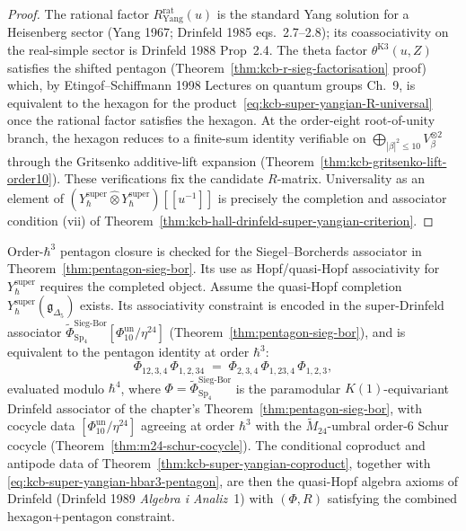 \begin{proof}
The rational factor $R^{\mathrm{rat}}_{\mathrm{Yang}}(u)$ is the
standard Yang solution for a Heisenberg sector (Yang 1967; Drinfeld
1985 eqs.~2.7--2.8); its coassociativity on the real-simple sector is
Drinfeld 1988 Prop~2.4. The theta factor $\theta^{\mathrm{K3}}(u,Z)$
satisfies the shifted pentagon
(Theorem~\ref{thm:kcb-r-sieg-factorisation} proof)
which, by Etingof--Schiffmann 1998
\textup{Lectures on quantum groups} Ch.~9, is equivalent to the
hexagon for the product~\eqref{eq:kcb-super-yangian-R-universal} once
the rational factor satisfies the hexagon. At the order-eight
root-of-unity branch, the hexagon
reduces to a finite-sum identity verifiable on
$\bigoplus_{|\beta|^2\leq 10}V_\beta^{\otimes 2}$ through the
Gritsenko additive-lift expansion
(Theorem~\ref{thm:kcb-gritsenko-lift-order10}). These verifications fix
the candidate \(R\)-matrix. Universality as an element of
\((Y_\hbar^{\mathrm{super}}\widehat\otimes
Y_\hbar^{\mathrm{super}})[[u^{-1}]]\) is precisely the completion and
associator condition \textup{(vii)} of
Theorem~\ref{thm:kcb-hall-drinfeld-super-yangian-criterion}.
\end{proof}

\begin{theorem}
\label{thm:kcb-super-yangian-hbar3-pentagon}
Order-\(\hbar^3\) pentagon closure is checked for the
Siegel--Borcherds associator in
Theorem~\ref{thm:pentagon-sieg-bor}. Its use as Hopf/quasi-Hopf
associativity for \(Y_\hbar^{\mathrm{super}}\) requires the completed
object. Assume the quasi-Hopf completion
$Y_\hbar^{\mathrm{super}}(\mathfrak{g}_{\Delta_5})$ exists. Its
associativity constraint is encoded in the
super-Drinfeld associator
$\widetilde\Phi^{\mathrm{Sieg\text{-}Bor}}_{\mathrm{Sp}_4}[\Phi_{10}^{\mathrm{un}}/\eta^{24}]$
(Theorem~\ref{thm:pentagon-sieg-bor}), and is equivalent to the
pentagon identity at order $\hbar^3$:
\begin{equation}
\label{eq:kcb-super-yangian-hbar3-pentagon}
 \Phi_{12,3,4}\,\Phi_{1,2,34}
 \;=\;
 \Phi_{2,3,4}\,\Phi_{1,23,4}\,\Phi_{1,2,3},
\end{equation}
evaluated modulo $\hbar^4$, where
$\Phi=\widetilde\Phi^{\mathrm{Sieg\text{-}Bor}}_{\mathrm{Sp}_4}$ is the
paramodular $K(1)$-equivariant Drinfeld associator of the chapter's
Theorem~\ref{thm:pentagon-sieg-bor}, with cocycle data
$[\Phi_{10}^{\mathrm{un}}/\eta^{24}]$ agreeing at order $\hbar^3$ with the
$\widetilde{M}_{24}$-umbral order-$6$ Schur cocycle
(Theorem~\ref{thm:m24-schur-cocycle}). The conditional coproduct and
antipode data of Theorem~\ref{thm:kcb-super-yangian-coproduct},
together with \eqref{eq:kcb-super-yangian-hbar3-pentagon}, are then
the quasi-Hopf algebra axioms of Drinfeld (Drinfeld 1989
\emph{Algebra i Analiz}~1) with
$(\Phi,R)$ satisfying the combined hexagon+pentagon constraint.
\end{theorem}

